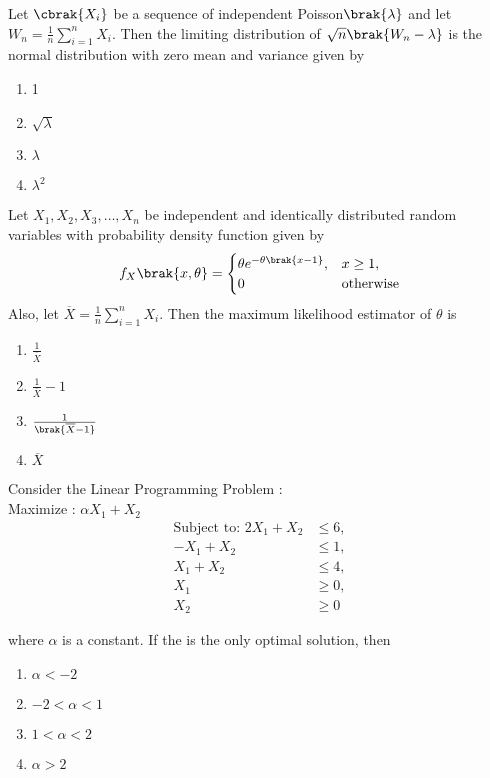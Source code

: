 \item Let $\cbrak{X_i}$ be a sequence of independent Poisson$\brak{\lambda}$ and let $W_n=\frac{1}{n}\sum_{i=1}^n X_i$. Then the limiting distribution of $\sqrt{n}\brak{W_n-\lambda}$ is the normal distribution with zero mean and variance given by 
\begin{multicols}{4}
    \begin{enumerate}
        \item 1
        \item $\sqrt{\lambda}$
        \item $\lambda$
        \item $\lambda^2$
    \end{enumerate}
\end{multicols}
\item Let $X_1,X_2,X_3,\dots,X_n$ be independent and identically distributed random variables with probability density function given by 
\begin{align*}
    f_X\brak{x,\theta}=
    \begin{cases}
        \theta e^{-\theta\brak{x-1}}, & x \ge 1,\\ 0 & \text{otherwise} 
    \end{cases}
\end{align*}
Also, let $\overline{X}=\frac{1}{n}\sum_{i=1}^nX_i$. Then the maximum likelihood estimator of $\theta$ is 
\begin{multicols}{4}
    \begin{enumerate}
        \item $\frac{1}{\overline{X}}$
        \item $\frac{1}{\overline{X}}-1$
        \item $\frac{1}{\brak{\overline{X}-1}}$
        \item $\overline{X}$
    \end{enumerate}
\end{multicols}
\item Consider the Linear Programming Problem :\\
Maximize : $\alpha X_1+X_2$\\
\vspace{-3em}
\begin{align*}
\text{Subject to: } 2X_1 + X_2 &\leq 6, \\
-X_1 + X_2 &\leq 1, \\
X_1 + X_2 &\leq 4, \\
X_1 &\geq 0, \\
X_2 &\geq 0
\end{align*}

where $\alpha$ is a constant. If the  is the only optimal solution, then 
\begin{multicols}{4}
    \begin{enumerate}
        \item $\alpha <-2$
        \item $-2<\alpha<1$
        \item $1<\alpha<2$
        \item $\alpha>2$
    \end{enumerate}
\end{multicols}

